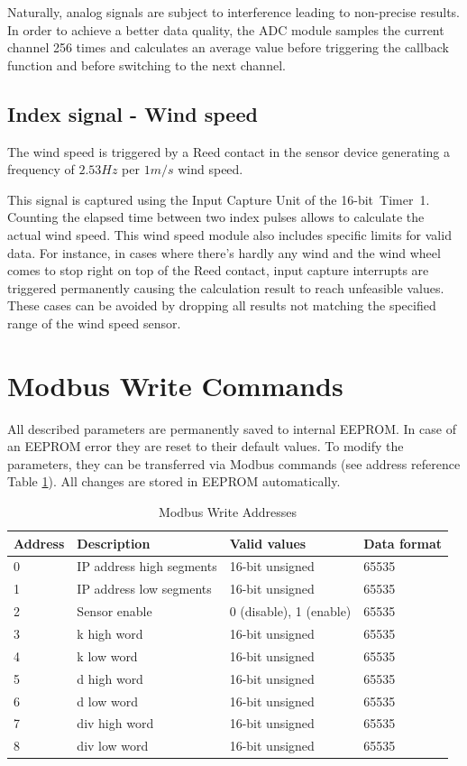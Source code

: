 Naturally, analog signals are subject to interference leading to non-precise results. In order to achieve a better data quality, the ADC module samples the current channel 256 times and calculates an average value before triggering the callback function and before switching to the next channel.

\subsection{Index signal - Wind speed}
The wind speed is triggered by a Reed contact in the sensor device generating a frequency of $2.53 Hz$ per $1 m/s$ wind speed.

This signal is captured using the Input Capture Unit of the 16-bit~Timer~1. Counting the elapsed time between two index pulses allows to calculate the actual wind speed. This wind speed module also includes specific limits for valid data. For instance, in cases where there's hardly any wind and the wind wheel comes to stop right on top of the Reed contact, input capture interrupts are triggered permanently causing the calculation result to reach unfeasible values. These cases can be avoided by dropping all results not matching the specified range of the wind speed sensor.

\section{Modbus Write Commands}
All described parameters are permanently saved to internal EEPROM. In case of an EEPROM error they are reset to their default values. To modify the parameters, they can be transferred via Modbus commands (see address reference Table \ref{tab:modbus_write}). All changes are stored in EEPROM automatically.

\begin{table}[ht]
    \centering
    \begin{tabular}{|l|l|l|l|}
    \hline \textbf{Address} & \textbf{Description} & \textbf{Valid values} & \textbf{Data format} \\ 
    \hline
    \hline 0 & IP address high segments & 16-bit unsigned & 65535 \\ 
    \hline 1 & IP address low segments & 16-bit unsigned & 65535 \\ 
    \hline 2 & Sensor enable & 0 (disable), 1 (enable) & 65535 \\ 
    \hline 3 & k high word & 16-bit unsigned & 65535 \\ 
    \hline 4 & k low word & 16-bit unsigned & 65535 \\ 
    \hline 5 & d high word & 16-bit unsigned & 65535 \\ 
    \hline 6 & d low word & 16-bit unsigned & 65535 \\ 
    \hline 7 & div high word & 16-bit unsigned & 65535 \\ 
    \hline 8 & div low word & 16-bit unsigned & 65535 \\ 
    \hline 
    \end{tabular}
    \caption{Modbus Write Addresses}
    \label{tab:modbus_write}
\end{table}

